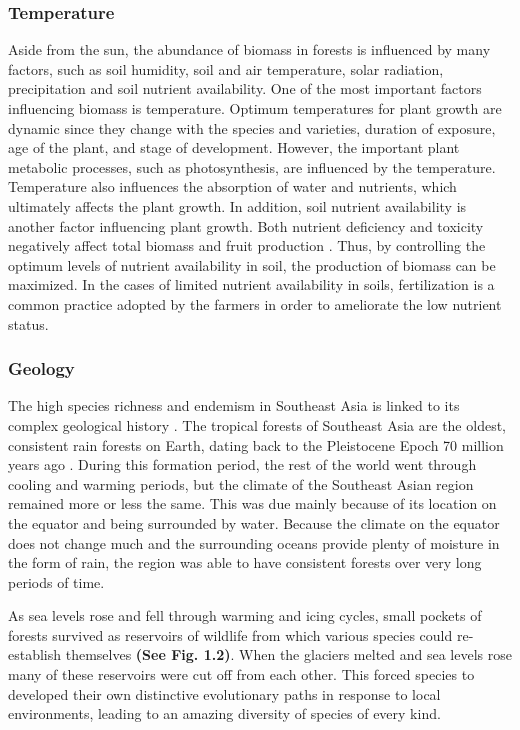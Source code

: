 \subsubsection{Temperature}
	Aside from the sun, the abundance of biomass in forests is influenced by many factors, such as soil humidity, soil and air temperature, solar radiation, precipitation and soil nutrient availability. One of the most important factors influencing biomass is temperature. Optimum temperatures for plant growth are dynamic since they change with the species and varieties, duration of exposure, age of the plant, and stage of development\citep{marshall1988environmental}. However, the important plant metabolic processes, such as photosynthesis, are influenced by the temperature. Temperature also influences the absorption of water and nutrients, which ultimately affects the plant growth. In addition, soil nutrient availability is another factor influencing plant growth. Both nutrient deficiency and toxicity negatively affect total biomass and fruit production \citep{chatzistathis2013soil}. Thus, by controlling the optimum levels of nutrient availability in soil, the production of biomass can be maximized. In the cases of limited nutrient availability in soils, fertilization is a common practice adopted by the farmers in order to ameliorate the low nutrient status. 

\subsubsection{Geology}
	The high species richness and endemism in Southeast Asia is linked to its complex geological history \citep{sodhi2004southeast}. The tropical forests of Southeast Asia are the oldest, consistent rain forests on Earth, dating back to the Pleistocene Epoch 70 million years ago \cite{hutchison1989geological}. During this formation period, the rest of the world went through cooling and warming periods, but the climate of the Southeast Asian region remained more or less the same. This was due mainly because of its location on the equator and being surrounded by water. Because the climate on the equator does not change much and the surrounding oceans provide plenty of moisture in the form of rain, the region was able to have consistent forests over very long periods of time. 

  As sea levels rose and fell through warming and icing cycles, small pockets of forests survived as reservoirs of wildlife from which various species could re-establish themselves \textbf{(See Fig. 1.2)}. When the glaciers melted and sea levels rose many of these reservoirs were cut off from each other. This forced species to developed their own distinctive evolutionary paths in response to local environments, leading to an amazing diversity of species of every kind.
  
